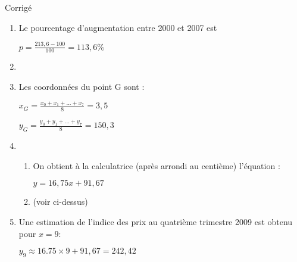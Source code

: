 \begin{corrige}
     \begin{h3}Corrigé\end{h3}
     \begin{enumerate}
          \item
          Le pourcentage d'augmentation entre 2000 et 2007 est
          \par
          $p=\frac{213,6-100}{100}=113,6\%$
          \item
 
\\
\begin{center}
\end{center}
          \item
          Les coordonnées du point G sont :
          \par
          $x_{G}=\frac{x_{0}+x_{1}+ . . . +x_{7}}{8}=3,5$
          \par
          $y_{G}=\frac{y_{0}+y_{1}+ . . . +y_{7}}{8}=150,3$
          \item
          \begin{enumerate}[label=\alph*.]
               \item
               On obtient à la calculatrice (après arrondi au centième) l'équation :
               \par
               $y=16,75x+91,67$
 \item
(voir ci-dessus)
          \end{enumerate}
          \item
          Une estimation de l'indice des prix au quatrième trimestre 2009 est obtenu pour $x=9$:
          \par
          $y_{9}\approx 16.75\times 9+91,67=242,42$
     \end{enumerate}
\end{corrige}
